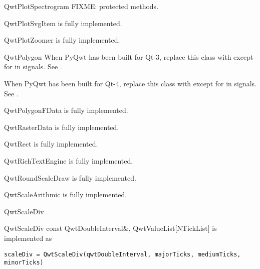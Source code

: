 \documentclass{manual}
\begin{document}
{\begin{classdesc*}{QwtPlotSpectrogram}
  FIXME: protected methods.
\end{classdesc*}

\begin{classdesc*}{QwtPlotSvgItem}
  is fully implemented.
\end{classdesc*}

\begin{classdesc*}{QwtPlotZoomer}
  is fully implemented.
\end{classdesc*}

\begin{classdesc*}{QwtPolygon}
  When PyQwt has been built for Qt-3, replace this class with
   except for in signals. See .

  When PyQwt has been built for Qt-4, replace this class with 
  except for in signals. See .
\end{classdesc*}

\begin{classdesc*}{QwtPolygonFData}
  is fully implemented.
\end{classdesc*}

\begin{classdesc*}{QwtRasterData}
  is fully implemented.
\end{classdesc*}

\begin{classdesc*}{QwtRect}
  is fully implemented.
\end{classdesc*}

\begin{classdesc*}{QwtRichTextEngine}
  is fully implemented.
\end{classdesc*}

\begin{classdesc*}{QwtRoundScaleDraw}
  is fully implemented.
\end{classdesc*}

\begin{classdesc*}{QwtScaleArithmic}
  is fully implemented.
\end{classdesc*}

\begin{classdesc*}{QwtScaleDiv}

  \begin{cfuncdesc}{}
    {QwtScaleDiv}{
      const QwtDoubleInterval\&,
      QwtValueList[NTickList]}
    is implemented as
    \begin{verbatim}
scaleDiv = QwtScaleDiv(qwtDoubleInterval, majorTicks, mediumTicks, minorTicks)
    \end{verbatim}
  \end{cfuncdesc}


\end{classdesc*}}
\end{document}
